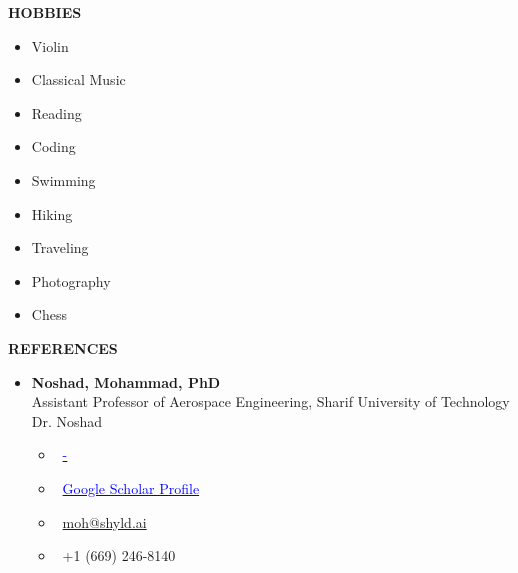 \documentclass[12pt]{article}
\begin{document}
\begin{center}
	{\noindent \bfseries HOBBIES}
\end{center}
\begin{multicols}{3}
\begin{itemize} \itemsep -4pt
    \item Violin \faMusic
    \item Classical Music  \faHeadphones
    \item Reading  \faBook
    \item Coding  \faLaptopCode
    \item Swimming \faSwimmer
    \item Hiking \faMountain
    \item Traveling \faPlane
    \item Photography \faCamera
    \item Chess \faChess
\end{itemize}
\end{multicols}



\vspace{0.2in} %


\begin{center}
	{\noindent \bfseries REFERENCES}
\end{center}

{
	\begin{itemize}
		\item \textbf{Noshad, Mohammad, PhD} \\
		Assistant Professor of Aerospace Engineering, Sharif University of Technology \\
	Dr. Noshad
		\begin{multicols}{2}
			\begin{itemize}
				\item \faGlobe \ \href{-5}{\textcolor{blue}{-}}
				\item \faGraduationCap \ \href{https://scholar.google.com/citations?user=YJIJLs0AAAAJ&hl=en}{\textcolor{blue}{Google Scholar Profile}}
				\item \faEnvelope \ \href{mailto:moh@shyld.ai}{moh@shyld.ai}
				\item \faPhone \ +1 (669) 246-8140
			\end{itemize}
	\end{multicols}
	\end{itemize}
 }{}
\end{document}
